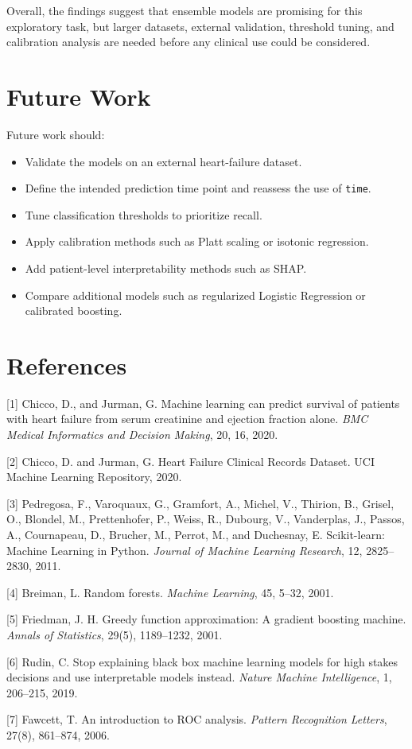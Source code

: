 \documentclass{article}
\begin{document}
Overall, the findings suggest that ensemble models are promising for this exploratory task, but larger datasets, external validation, threshold tuning, and calibration analysis are needed before any clinical use could be considered.

\section{Future Work}

Future work should:
\begin{itemize}
    \item Validate the models on an external heart-failure dataset.
    \item Define the intended prediction time point and reassess the use of \texttt{time}.
    \item Tune classification thresholds to prioritize recall.
    \item Apply calibration methods such as Platt scaling or isotonic regression.
    \item Add patient-level interpretability methods such as SHAP.
    \item Compare additional models such as regularized Logistic Regression or calibrated boosting.
\end{itemize}

\section*{References}

\small

[1] Chicco, D., and Jurman, G. Machine learning can predict survival of patients with heart failure from serum creatinine and ejection fraction alone. \textit{BMC Medical Informatics and Decision Making}, 20, 16, 2020.

[2] Chicco, D. and Jurman, G. Heart Failure Clinical Records Dataset. UCI Machine Learning Repository, 2020.

[3] Pedregosa, F., Varoquaux, G., Gramfort, A., Michel, V., Thirion, B., Grisel, O., Blondel, M., Prettenhofer, P., Weiss, R., Dubourg, V., Vanderplas, J., Passos, A., Cournapeau, D., Brucher, M., Perrot, M., and Duchesnay, E. Scikit-learn: Machine Learning in Python. \textit{Journal of Machine Learning Research}, 12, 2825--2830, 2011.

[4] Breiman, L. Random forests. \textit{Machine Learning}, 45, 5--32, 2001.

[5] Friedman, J. H. Greedy function approximation: A gradient boosting machine. \textit{Annals of Statistics}, 29(5), 1189--1232, 2001.

[6] Rudin, C. Stop explaining black box machine learning models for high stakes decisions and use interpretable models instead. \textit{Nature Machine Intelligence}, 1, 206--215, 2019.

[7] Fawcett, T. An introduction to ROC analysis. \textit{Pattern Recognition Letters}, 27(8), 861--874, 2006.
\end{document}
